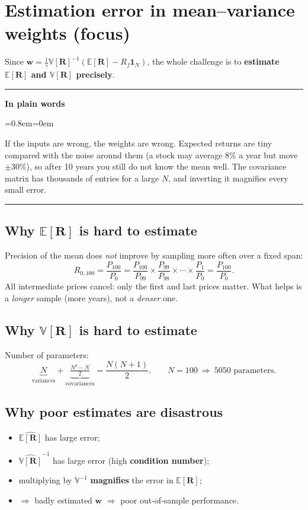 \documentclass[11pt,a4paper]{report}
\newenvironment{notebox}[1]
  {\par\medskip\Needspace{6\baselineskip}\noindent\rule{\linewidth}{0.4pt}\par\nopagebreak
   \noindent\textbf{#1}\par\nopagebreak
   \begin{list}{}{\leftmargin=0.8em\rightmargin=0em\topsep=2pt}\item[]}
  {\end{list}\nopagebreak\noindent\rule{\linewidth}{0.4pt}\par\medskip}
\newenvironment{plainbox}{\begin{notebox}{In plain words}}{\end{notebox}}
\newcommand{\E}{\mathbb{E}}
\newcommand{\V}{\mathbb{V}}
\newcommand{\one}{\mathbf{1}_N}
\newcommand{\w}{\bm{w}}
\newcommand{\R}{\bm{R}}
\newcommand{\Rf}{R_f}
\begin{document}
\section{Estimation error in mean--variance weights (focus)}

Since $\w=\frac1\gamma\V[\R]^{-1}(\E[\R]-\Rf\one)$, the whole challenge is to
\textbf{estimate $\E[\R]$ and $\V[\R]$ precisely}.

\begin{plainbox}
If the inputs are wrong, the weights are wrong. Expected returns are tiny
compared with the noise around them (a stock may average 8\% a year but move
$\pm30\%$), so after 10 years you still do not know the mean well. The covariance
matrix has thousands of entries for a large $N$, and inverting it magnifies
every small error.
\end{plainbox}
\subsection{Why $\E[\R]$ is hard to estimate}
Precision of the mean does \emph{not} improve by sampling more often over a
fixed span:
\[
  R_{0,100}=\frac{P_{100}}{P_0}
  =\frac{P_{100}}{P_{99}}\times\frac{P_{99}}{P_{98}}\times\cdots\times\frac{P_1}{P_0}
  =\frac{P_{100}}{P_0}.
\]
All intermediate prices cancel: only the first and last prices matter.
What helps is a \emph{longer} sample (more years), not a \emph{denser} one.

\subsection{Why $\V[\R]$ is hard to estimate}
Number of parameters:
\[
  \underbrace{N}_{\text{variances}}+\underbrace{\tfrac{N^2-N}{2}}_{\text{covariances}}
  =\frac{N(N+1)}{2}. \qquad N=100\ \Rightarrow\ 5050 \text{ parameters.}
\]

\subsection{Why poor estimates are disastrous}
\begin{itemize}
  \item $\widehat{\E[\R]}$ has large error;
  \item $\widehat{\V[\R]}^{-1}$ has large error (high \textbf{condition number});
  \item multiplying by $\V^{-1}$ \textbf{magnifies} the error in $\E[\R]$;
  \item $\Rightarrow$ badly estimated $\w$ $\Rightarrow$ poor out-of-sample performance.
\end{itemize}
\end{document}
